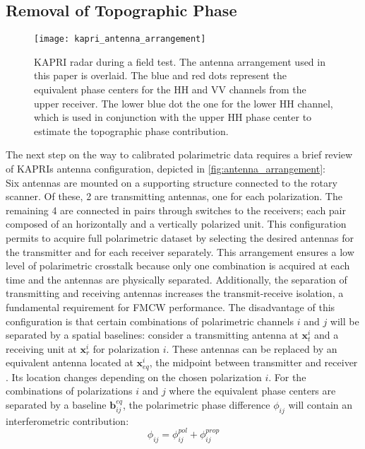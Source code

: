 \subsection{Removal of Topographic Phase}\label{sec:methods:topo_removal}
\begin{figure}[ht]
	\centering
	\texttt{[image: kapri\_antenna\_arrangement]}
	\caption{KAPRI radar during a field test. The antenna arrangement used in this paper is overlaid. The blue and red dots represent the equivalent phase centers for the  HH and VV channels from the upper receiver. The lower blue dot the one for the lower HH channel, which is used in conjunction with the upper HH phase center to estimate the topographic phase contribution.}
	\label{fig:antenna_arrangement}
\end{figure}
 The next step on the way to calibrated polarimetric data requires a brief review of KAPRIs antenna configuration, depicted in \autoref{fig:antenna_arrangement}:\\ Six antennas are mounted on a supporting structure connected to the rotary scanner. Of these, 2 are transmitting antennas, one for each polarization. The remaining 4 are connected in pairs through switches to the receivers; each pair composed of an horizontally and a vertically polarized unit. This configuration permits to acquire full polarimetric dataset by selecting the desired antennas for the transmitter and for each receiver separately. This arrangement ensures a low level of polarimetric crosstalk because only one combination is acquired at each time and the antennas are physically separated. Additionally, the separation of transmitting and receiving antennas increases the transmit-receive isolation, a fundamental requirement for FMCW performance\cite{Beasley1990,Stove1992, Strozzi2011}.  The disadvantage of this configuration is that certain combinations of polarimetric channels $i$ and $j$ will be separated by a spatial baselines:
 consider a transmitting antenna at $\mathbf{x}_t^i$ and a receiving unit at $\mathbf{x}_r^i$ for polarization $i$. These antennas can be replaced by an equivalent antenna located at $\mathbf{x}_{eq}^i$, the midpoint between transmitter and receiver \cite{Pipia2009}. Its location changes depending on the chosen polarization $i$. For the combinations of polarizations $i$ and $j$ where the equivalent phase centers are separated by a baseline $\mathbf{b}_{ij}^{eq}$, the polarimetric phase difference 	$\phi_{ij}$  will contain an interferometric contribution:
\begin{equation}
	\phi_{ij} = \phi_{ij}^{pol} + \phi_{ij}^{prop}
\end{equation}
